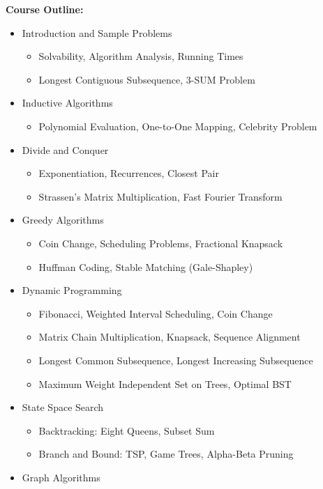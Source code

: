 \documentclass[12pt]{article}
\begin{document}
\textbf{Course Outline:}
\begin{itemize}
    \item Introduction and Sample Problems
    \begin{itemize}
        \item Solvability, Algorithm Analysis, Running Times
        \item Longest Contiguous Subsequence, 3-SUM Problem
    \end{itemize}
    \item Inductive Algorithms
    \begin{itemize}
        \item Polynomial Evaluation, One-to-One Mapping, Celebrity Problem
    \end{itemize}
    \item Divide and Conquer
    \begin{itemize}
        \item Exponentiation, Recurrences, Closest Pair
        \item Strassen’s Matrix Multiplication, Fast Fourier Transform
    \end{itemize}
    \item Greedy Algorithms
    \begin{itemize}
        \item Coin Change, Scheduling Problems, Fractional Knapsack
        \item Huffman Coding, Stable Matching (Gale-Shapley)
    \end{itemize}
    \item Dynamic Programming
    \begin{itemize}
        \item Fibonacci, Weighted Interval Scheduling, Coin Change
        \item Matrix Chain Multiplication, Knapsack, Sequence Alignment
        \item Longest Common Subsequence, Longest Increasing Subsequence
        \item Maximum Weight Independent Set on Trees, Optimal BST
    \end{itemize}
    \item State Space Search
    \begin{itemize}
        \item Backtracking: Eight Queens, Subset Sum
        \item Branch and Bound: TSP, Game Trees, Alpha-Beta Pruning
    \end{itemize}
    \item Graph Algorithms

\end{itemize}
\end{document}
